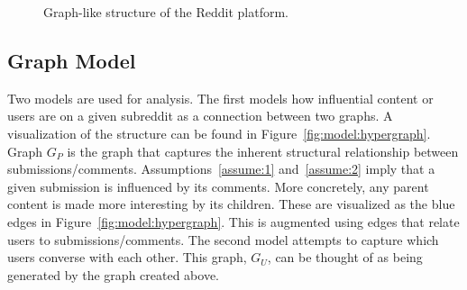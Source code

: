 \documentclass[letterpaper, 10 pt, conference]{ieeeconf}
\theoremstyle{definition}
\begin{document}
\begin{figure}
  \centering
  \caption{Graph-like structure of the Reddit platform.}
  \label{fig:model:reddit}
\end{figure}

\subsection{Graph Model}
Two models are used for analysis. The first models how influential content or users are on a given subreddit as a connection between two graphs. A visualization of the structure can be found in Figure~\ref{fig:model:hypergraph}. Graph \(G_P\) is the graph that captures the inherent structural relationship between submissions/comments. Assumptions~\ref{assume:1} and~\ref{assume:2} imply that a given submission is influenced by its comments. More concretely, any parent content is made more interesting by its children. These are visualized as the blue edges in Figure~\ref{fig:model:hypergraph}. This is augmented using edges that relate users to submissions/comments. The second model attempts to capture which users converse with each other. This graph, \(G_U\), can be thought of as being generated by the graph created above.
\end{document}
